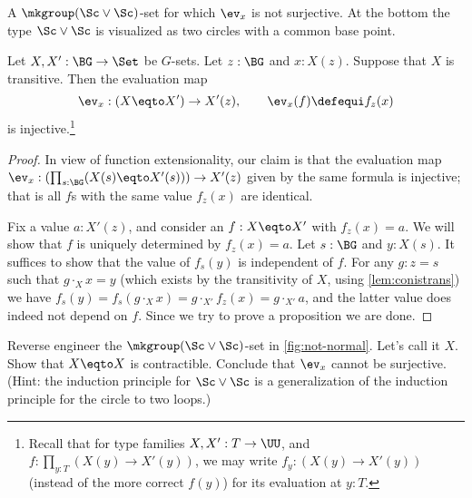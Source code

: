 \begin{marginfigure}
  \caption{A $\mkgroup(\Sc\vee\Sc)$-set for which $\protect\ev_x$ is not
   surjective. At the bottom the type $\Sc\vee\Sc$ is visualized as
   two circles with a common base point. }
  \label{fig:not-normal}
\end{marginfigure}

\begin{lemma}
  \label{lem:evisinjwhentransitive}
  Let $X,X':\BG\to\Set$ be $G$-sets. Let $z:\BG$ and $x:X(z)$.
  Suppose that $X$ is transitive. Then the evaluation map
  \[
    \ev_x:(X \eqto X')\to X'(z),\qquad \ev_x(f)\defequi f_z(x)
  \]
  is injective.\footnote{%
    Recall that for type families $X,X':T\to\UU$, and
    $f:\prod_{y:T}(X(y)\to X'(y))$, we may write $f_y:(X(y)\to X'(y))$
    (instead of the more correct $f(y)$) for its evaluation at $y:T$.}
\end{lemma}
\begin{proof}
  In view of function extensionality, our claim is that the evaluation
  map $\ev_x:(\prod_{s:\BG}(X(s)\eqto X'(s)))\to X'(z)$ given by the 
  same formula is injective; that is all $f$s with the same 
  value $f_z(x)$ are identical.

  Fix a value $a:X'(z)$, and consider an $f:X\eqto X'$ with $f_z(x)=a$.
  We will show that $f$ is uniquely determined by $f_z(x)=a$.
  Let $s:\BG$ and  $y:X(s)$. It suffices to show that the value 
  of $f_s(y)$ is independent of $f$. 
  For any $g:z=s$ such that $g\cdot_X x=y$ (which exists by the 
  transitivity of $X$, using \cref{lem:conistrans}) we have
  $f_s(y)=f_s(g\cdot_X x)=g \cdot_{X'} f_z(x)=g \cdot_{X'} a$,
  and the latter value does indeed not depend on $f$.
  Since we try to prove a proposition we are done.
\end{proof}

\begin{xca}\label{xca:not-normal}
Reverse engineer the $\mkgroup(\Sc\vee\Sc)$-set in \cref{fig:not-normal}.
Let's call it $X$. Show that $X\eqto X$ is contractible.
Conclude that $\ev_x$ cannot be surjective.
(Hint: the induction principle for $\Sc\vee\Sc$ is a generalization
of the induction principle for the circle to two loops.)
\end{xca}

